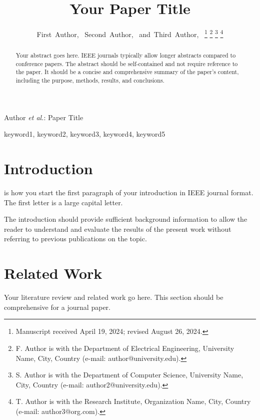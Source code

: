 \documentclass[journal,twoside]{IEEEtran}
\begin{document}
\title{Your Paper Title}

\author{First~Author,~
        Second~Author,~
        and~Third~Author,~%
\thanks{Manuscript received April 19, 2024; revised August 26, 2024.}
\thanks{F. Author is with the Department of Electrical Engineering, University Name, City, Country (e-mail: author@university.edu).}
\thanks{S. Author is with the Department of Computer Science, University Name, City, Country (e-mail: author2@university.edu).}
\thanks{T. Author is with the Research Institute, Organization Name, City, Country (e-mail: author3@org.com).}}

%
{Author \MakeLowercase{\textit{et al.}}: Paper Title}

\maketitle

\begin{abstract}
Your abstract goes here. IEEE journals typically allow longer abstracts compared to conference papers. The abstract should be self-contained and not require reference to the paper. It should be a concise and comprehensive summary of the paper's content, including the purpose, methods, results, and conclusions.
\end{abstract}

\begin{IEEEkeywords}
keyword1, keyword2, keyword3, keyword4, keyword5
\end{IEEEkeywords}

\section{Introduction}
 is how you start the first paragraph of your introduction in IEEE journal format. The first letter is a large capital letter.

The introduction should provide sufficient background information to allow the reader to understand and evaluate the results of the present work without referring to previous publications on the topic.

\section{Related Work}
Your literature review and related work go here. This section should be comprehensive for a journal paper.
\end{document}
